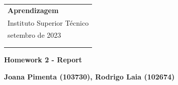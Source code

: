 \documentclass[a4paper,12pt]{article} %
\begin{document}
\thispagestyle{empty} %

\begin{tabular}{p{15.5cm}} %
{\large \bf Aprendizagem} \\
Instituto Superior Técnico \\ setembro de 2023  \\ \\ 
\hline %
\\
\end{tabular} %

\vspace*{0.3cm} %

\begin{center} %
	{\Large \bf Homework 2 - Report} %
	\vspace{2mm}
	
	{\bf Joana Pimenta (103730), Rodrigo Laia (102674) } %
		
\end{center}  

\vspace{0.4cm}


\end{document}
